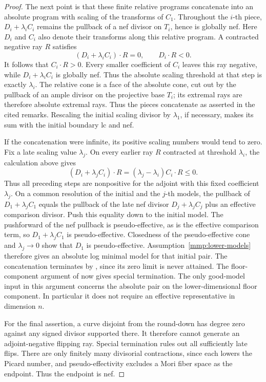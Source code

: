 \begin{proof}
The next point is that these finite relative programs concatenate
into an absolute program with scaling of the transforms of \(C_1\).
Throughout the \(i\)-th piece, \(D_i+\lambda_i C_i\) remains
the pullback of a nef divisor on \(T_i\), hence is globally nef.
Here $D_i$ and $C_i$ also denote their transforms along this
relative program. A contracted negative ray $R$ satisfies
\[
 (D_i+\lambda_i C_i)\cdot R=0,
 \qquad D_i\cdot R<0.
\]
It follows that $C_i\cdot R>0$. Every smaller coefficient of
$C_i$ leaves this ray negative, while $D_i+\lambda_i C_i$ is
globally nef. Thus the absolute scaling threshold at that step
is exactly $\lambda_i$.
The relative cone is a face of the absolute cone, cut out by
the pullback of an ample divisor on the projective base \(T_i\);
its extremal rays are therefore absolute extremal rays.
Thus the pieces concatenate as asserted in the cited remarks.
Rescaling the initial scaling divisor by \(\lambda_1\), if
necessary, makes its sum with the initial boundary lc and nef.

If the concatenation were infinite, its positive scaling numbers
would tend to zero. Fix a late scaling value $\lambda_j$.
On every earlier ray $R$ contracted at threshold $\lambda_i$,
the calculation above gives
\[
 (D_i+\lambda_j C_i)\cdot R
   =(\lambda_j-\lambda_i)C_i\cdot R\le0.
\]
Thus all preceding steps are nonpositive for the adjoint with
this fixed coefficient $\lambda_j$. On a common resolution of
the initial and the $j$-th models, the pullback of
$D_1+\lambda_j C_1$ equals the pullback of the late nef divisor
$D_j+\lambda_j C_j$ plus an effective comparison divisor.
Push this equality down to the initial model. The pushforward
of the nef pullback is pseudo-effective, as is the effective
comparison term, so $D_1+\lambda_j C_1$ is pseudo-effective.
Closedness of the pseudo-effective cone and $\lambda_j\to0$
show that $D_1$ is pseudo-effective.
Assumption~\ref{mmp:lower-models} therefore gives an absolute
log minimal model for that initial pair. The concatenation
terminates by \cite[Theorem~1.9(iii)]{Birkar2012Special}, since
its zero limit is never attained. The floor-component argument
of \cite[Lemma~3.6]{Birkar2010} now gives special termination.
The only good-model input in this argument concerns the absolute
pair on the lower-dimensional floor component. In particular it
does not require an effective representative in dimension \(n\).

For the final assertion, a curve disjoint from the round-down
has degree zero against any signed divisor supported there.
It therefore cannot generate an adjoint-negative flipping ray.
Special termination rules out all sufficiently late flips.
There are only finitely many divisorial contractions, since
each lowers the Picard number, and pseudo-effectivity excludes
a Mori fiber space as the endpoint. Thus the endpoint is nef.
\end{proof}


